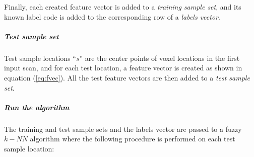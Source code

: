 Finally, each created feature vector is added to a \textit{training sample set},
and its known label code is added to the corresponding row of a \textit{labels vector}.

\subparagraph*{Test sample set} %

Test sample locations ``$s$'' are the center points of voxel locations in the first input scan, and for each test location, a feature vector is created as shown in equation (\ref{eq:fvec}). All the test feature vectors are then added to a \textit{test sample set}.

\subparagraph*{Run the algorithm} %

The training and test sample sets and the labels vector are passed to a fuzzy $k-NN$ algorithm
where the following procedure is performed on each test sample location:

